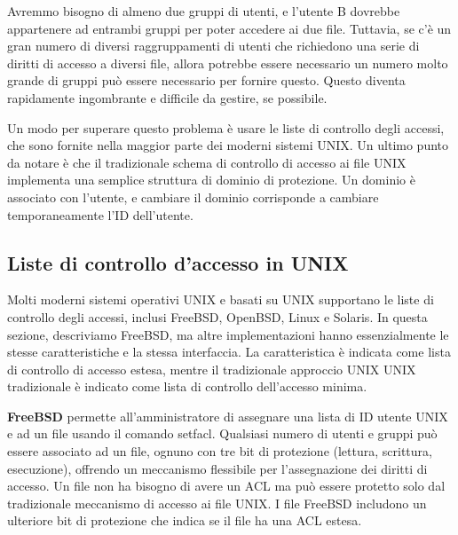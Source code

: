 \singlespacing

Avremmo bisogno di almeno due gruppi di utenti, e l'utente B dovrebbe appartenere ad entrambi gruppi per poter accedere ai due file. Tuttavia, se c'è un gran numero di diversi raggruppamenti di utenti che richiedono una serie di diritti di accesso a diversi file, allora potrebbe essere necessario un numero molto grande di gruppi può essere necessario per fornire questo. Questo diventa rapidamente ingombrante e difficile da gestire, se possibile.

\singlespacing

Un modo per superare questo problema è usare le liste di controllo degli accessi, che sono fornite nella maggior parte dei moderni sistemi UNIX. Un ultimo punto da notare è che il tradizionale schema di controllo di accesso ai file UNIX implementa una semplice struttura di dominio di protezione. Un dominio è associato con l'utente, e cambiare il dominio corrisponde a cambiare temporaneamente l'ID dell'utente.
\newpage
\subsection{Liste di controllo d'accesso in UNIX}
Molti moderni sistemi operativi UNIX e basati su UNIX supportano le liste di controllo degli accessi, inclusi FreeBSD, OpenBSD, Linux e Solaris. In questa sezione, descriviamo FreeBSD, ma altre implementazioni hanno essenzialmente le stesse caratteristiche e la stessa interfaccia. La caratteristica è indicata come lista di controllo di accesso estesa, mentre il tradizionale approccio UNIX UNIX tradizionale è indicato come lista di controllo dell'accesso minima.

\singlespacing

\textbf{FreeBSD} permette all'amministratore di assegnare una lista di ID utente UNIX e ad un file usando il comando setfacl. Qualsiasi numero di utenti e gruppi può essere associato ad un file, ognuno con tre bit di protezione (lettura, scrittura, esecuzione), offrendo un meccanismo flessibile per l'assegnazione dei diritti di accesso. Un file non ha bisogno di avere un ACL ma può essere protetto solo dal tradizionale meccanismo di accesso ai file UNIX. I file FreeBSD includono un ulteriore bit di protezione che indica se il file ha una ACL estesa.

